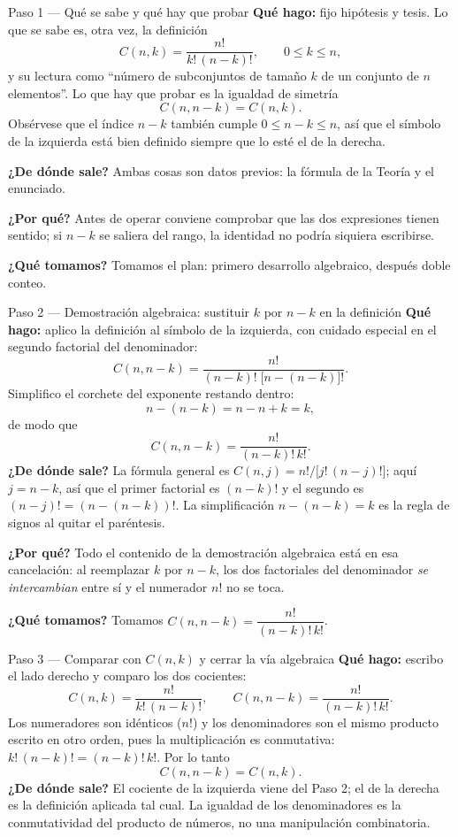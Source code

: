 \documentclass[11pt]{article}
\begin{document}
\begin{sol}
\begin{paso}{Paso 1 --- Qué se sabe y qué hay que probar}
\textbf{Qué hago:} fijo hipótesis y tesis. Lo que se sabe es, otra vez, la definición
\[
C(n,k)=\frac{n!}{k!\,(n-k)!},\qquad 0\le k\le n,
\]
y su lectura como ``número de subconjuntos de tamaño $k$ de un conjunto de $n$ elementos''. Lo
que hay que probar es la igualdad de simetría
\[
C(n,n-k)=C(n,k).
\]
Obsérvese que el índice $n-k$ también cumple $0\le n-k\le n$, así que el símbolo de la
izquierda está bien definido siempre que lo esté el de la derecha.

\textbf{¿De dónde sale?} Ambas cosas son datos previos: la fórmula de la Teoría y el
enunciado.

\textbf{¿Por qué?} Antes de operar conviene comprobar que las dos expresiones tienen sentido;
si $n-k$ se saliera del rango, la identidad no podría siquiera escribirse.

\textbf{¿Qué tomamos?} Tomamos el plan: primero desarrollo algebraico, después doble conteo.
\end{paso}

\begin{paso}{Paso 2 --- Demostración algebraica: sustituir $k$ por $n-k$ en la definición}
\textbf{Qué hago:} aplico la definición al símbolo de la izquierda, con cuidado especial en el
segundo factorial del denominador:
\[
C(n,n-k)=\frac{n!}{(n-k)!\;\bigl[n-(n-k)\bigr]!}.
\]
Simplifico el corchete del exponente restando dentro:
\[
n-(n-k)=n-n+k=k,
\]
de modo que
\[
C(n,n-k)=\frac{n!}{(n-k)!\,k!}.
\]
\textbf{¿De dónde sale?} La fórmula general es $C(n,j)=n!/\bigl[j!\,(n-j)!\bigr]$; aquí
$j=n-k$, así que el primer factorial es $(n-k)!$ y el segundo es $(n-j)!=(n-(n-k))!$. La
simplificación $n-(n-k)=k$ es la regla de signos al quitar el paréntesis.

\textbf{¿Por qué?} Todo el contenido de la demostración algebraica está en esa cancelación:
al reemplazar $k$ por $n-k$, los dos factoriales del denominador \emph{se intercambian} entre
sí y el numerador $n!$ no se toca.

\textbf{¿Qué tomamos?} Tomamos $C(n,n-k)=\dfrac{n!}{(n-k)!\,k!}$.
\end{paso}

\begin{paso}{Paso 3 --- Comparar con $C(n,k)$ y cerrar la vía algebraica}
\textbf{Qué hago:} escribo el lado derecho y comparo los dos cocientes:
\[
C(n,k)=\frac{n!}{k!\,(n-k)!},
\qquad
C(n,n-k)=\frac{n!}{(n-k)!\,k!} .
\]
Los numeradores son idénticos ($n!$) y los denominadores son el mismo producto escrito en otro
orden, pues la multiplicación es conmutativa: $k!\,(n-k)!=(n-k)!\,k!$. Por lo tanto
\[
C(n,n-k)=C(n,k).
\]
\textbf{¿De dónde sale?} El cociente de la izquierda viene del Paso 2; el de la derecha es la
definición aplicada tal cual. La igualdad de los denominadores es la conmutatividad del
producto de números, no una manipulación combinatoria.


\end{paso}
\end{sol}
\end{document}
